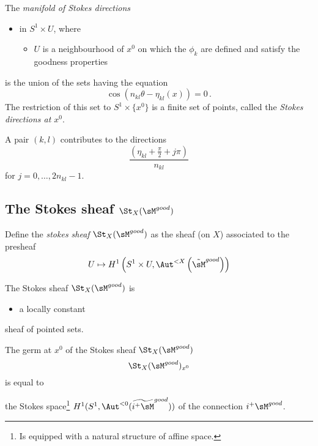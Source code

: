 \begin{defn}
  The \emph{manifold of Stokes directions}
  \begin{itemize}
    \item in $S^1\times U$, where
      \begin{itemize}
        \item $U$ is a neighbourhood of $x^0$ on which the $\phi_k$ are defined
          and satisfy the goodness properties
      \end{itemize}
  \end{itemize}
  is the union of the sets having the equation
  \[
    \cos(n_{kl}\theta-\eta_{kl}(x))=0 \,.
  \]
  The restriction of this set to $S^1\times\{x^0\}$ is a finite set of points,
  called the \emph{Stokes directions at $x^0$}.
  \begin{rem}
    A pair $(k,l)$ contributes to the directions
    \[
      \frac{\left(\eta_{kl}+\frac{\pi}{2}+j\pi\right)}{n_{kl}}
    \]
    for $j=0,\dots,2n_{kl}-1$.
  \end{rem}
\end{defn}
\begin{ex}
\end{ex}

\subsection{The Stokes sheaf $\St_X(\sM^{good})$}
\begin{defn}
  Define the \emph{stokes sheaf} $\St_X(\sM^{good})$ as the sheaf (on $X$)
  associated to the presheaf
  \[
    U\mapsto H^1\left(S^1\times U,\Aut^{<X}\left(\tilde \sM^{good}\right)\right)
  \]
\end{defn}
\begin{thm}
  The Stokes sheaf $\St_X(\sM^{good})$ is
  \begin{itemize}
    \item a locally constant
  \end{itemize}
  sheaf of pointed sets.
  \begin{comment}
    \begin{proof}
      \cite[p. 113]{sabbah2007isomonodromic}: paragraph 6.c.
    \end{proof}
  \end{comment}
\end{thm}
\begin{prop}
  The germ at $x^0$ of the Stokes sheaf $\St_X(\sM^{good})$
  \[
    \St_X(\sM^{good})_{x^0}
  \]
  is equal to
  \begin{center}
    the Stokes space\footnote{Is equipped with a natural structure of affine
    space.} $H^1(S^1,\Aut^{<0}(\widetilde{i^+\sM}^{good}))$ of the connection
    $i^+\sM^{good}$.
  \end{center}
\end{prop}

